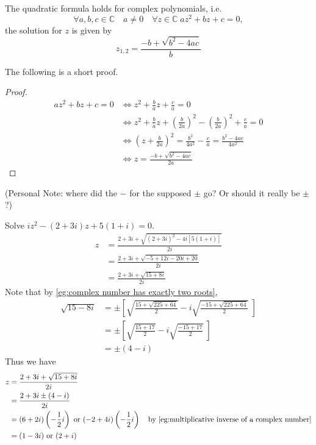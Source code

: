 \documentclass[notoc,notitlepage]{tufte-book}
\begin{document}
\begin{remark}\label{remark:quadratic formula for complex numbers}
	The quadratic formula holds for complex polynomials, i.e.
	\begin{equation*}
		\forall a, b, c \in \mathbb{C} \quad a \neq 0 \quad \forall z \in \mathbb{C} \; az^2 + bz + c = 0,
	\end{equation*}
	the solution for $z$ is given by
	\begin{equation}\label{eq:quadractic formula for complex numbers}
		z_{1, 2} = \frac{-b + \sqrt{b^2 - 4ac}}{b} 
	\end{equation}

	The following is a short proof.

	\begin{proof}
		\begin{align*}
			az^2 + bz + c = 0 &\iff z^2 + \frac{b}{a} z + \frac{c}{a} = 0 \\
				&\iff z^2 + \frac{b}{a} z + \left(\frac{b}{2a} \right)^2 - \left(\frac{b}{2a}\right)^2 + \frac{c}{a} = 0 \\
				&\iff \left(z + \frac{b}{2a} \right)^2 = \frac{b^2}{4a^2} - \frac{c}{a} = \frac{b^2 - 4ac}{4a^2} \\
				&\iff z = \frac{-b + \sqrt{b^2 - 4ac}}{2a}  
		\end{align*}
	\end{proof}

	(Personal Note: where did the $-$ for the supposed $\pm$ go? Or should it really be $\pm$?)
\end{remark}

\begin{eg}
	Solve $iz^2 - (2 + 3i)z + 5(1 + i) = 0$.
	\begin{align*}
		z &= \frac{2 + 3i + \sqrt{(2 + 3i)^2 - 4i[5(1 + i)]}}{2i} \\
			&= \frac{2 + 3i + \sqrt{-5 + 12i -20i + 20}}{2i} \\
			&= \frac{2 + 3i + \sqrt{15 + 8i}}{2i} 
	\end{align*}
	Note that by \cref{eg:complex number has exactly two roots},
	\begin{align*}
		\sqrt{15 - 8i} &= \pm \left[ \sqrt{\frac{15 + \sqrt{225 + 64}}{2} } - i \sqrt{\frac{-15 + \sqrt{225 + 64}}{2} } \; \right] \\
			&= \pm \left[ \sqrt{\frac{15 + 17}{2} } - i \sqrt{\frac{-15 + 17}{2} } \; \right] \\
			&= \pm (4 - i)
	\end{align*}
	Thus we have
	\begin{align*}
		z &= \frac{2 + 3i + \sqrt{15 + 8i}}{2i} \\
			&= \frac{2 + 3i \pm (4 - i)}{2i} \\
			&= (6 + 2i) \left( -\frac{1}{2}i \right) \text{ or } (-2 + 4i) \left( -\frac{1}{2} i \right) \quad \text{by } \cref{eg:multiplicative inverse of a complex number} \\
			&= (1 - 3i) \text{ or } (2 + i)
	\end{align*}
\end{eg}
\end{document}
